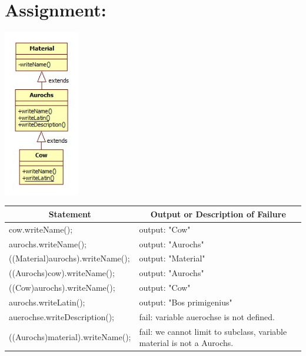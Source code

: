\documentclass[a4paper,12pt,oneside]{scrreprt}
\begin{document}
	\setcounter{chapter}{2} %
	\section{Assignment:}
	
    \includegraphics[keepaspectratio,width=0.25\textwidth,angle=0]{../uml/ClassDiagram1.jpg}
    
	\begin{table}[h]
		\centering
		\resizebox{\textwidth}{!}
		{%
			\begin{tabular}{|l|l|}
				\hline
				\multicolumn{1}{|c|}{\textbf{Statement}} & \multicolumn{1}{c|}{\textbf{Output or Description of Failure}} \\ \hline
				cow.writeName();                         & output: "Cow"         \\ \hline
				aurochs.writeName();                     & output: "Aurochs"     \\ \hline
				((Material)aurochs).writeName();         & output: "Material"    \\ \hline
				((Aurochs)cow).writeName();              & output: "Aurochs"     \\ \hline
				((Cow)aurochs).writeName();              & output: 
                "Cow"         \\ \hline
				aurochs.writeLatin();                    & output: "Bos primigenius"  \\ \hline
				auerochse.writeDescription();              & fail:
                variable auerochse is not defined.      \\ \hline
				((Aurochs)material).writeName();         & fail: we cannot limit to subclass, variable material is not a Aurochs.
				                                                                 \\ \hline
			\end{tabular}
		}
	\end{table}
	
\end{document}
